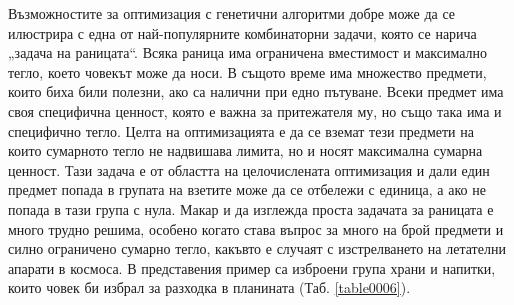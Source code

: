Възможностите за оптимизация с генетични алгоритми добре може да се илюстрира с една от най-популярните комбинаторни задачи, която се нарича „задача на раницата“. Всяка раница има ограничена вместимост и максимално тегло, което човекът може да носи. В същото време има множество предмети, които биха били полезни, ако са налични при едно пътуване. Всеки предмет има своя специфична ценност, която е важна за притежателя му, но също така има и специфично тегло. Целта на оптимизацията е да се вземат тези предмети на които сумарното тегло не надвишава лимита, но и носят максимална сумарна ценност. Тази задача е от областта на целочислената оптимизация и дали един предмет попада в групата на взетите може да се отбележи с единица, а ако не попада в тази група с нула. Макар и да изглежда проста задачата за раницата е много трудно решима, особено когато става въпрос за много на брой предмети и силно ограничено сумарно тегло, какъвто е случаят с изстрелването на летателни апарати в космоса. В представения пример са изброени група храни и напитки, които човек би избрал за разходка в планината (Таб. \ref{table0006}). 

